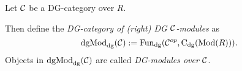 \begin{definition}[\( \dgMod_{\dg}(\Cc) \)]
    Let \( {\mathcal{C}} \) be a DG-category over \( R \).

    Then define the \emph{DG-category of (right) DG \( {\mathcal{C}} \)-modules} as
    \[
        \operatorname{dgMod}_{\operatorname{dg}}({\mathcal{C}}) := \operatorname{Fun}_{\operatorname{dg}}({\mathcal{C}}^{op}, \operatorname{C}_{\operatorname{dg}}(\operatorname{Mod}(R))).
    \]
    Objects in \( \dgMod_{\dg}(\Cc) \) are called \emph{DG-modules over \( {\mathcal{C}} \)}.
\end{definition}


